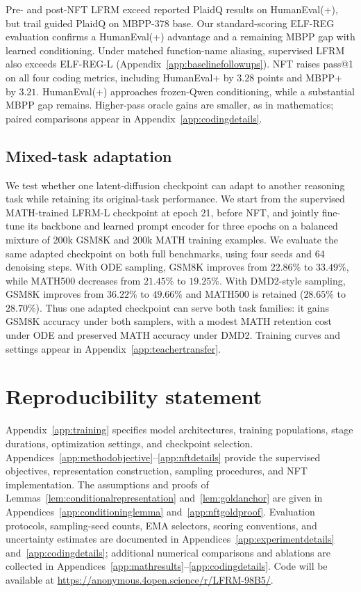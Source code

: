 \documentclass{article}
\newlength{\conferenceparskip}
\newcommand{\rev}[1]{{\color{blue}#1}}
\newcommand{\revp}[1]{\par\color{blue}#1\par\color{black}}
\begin{document}
Pre- and post-NFT LFRM exceed reported PlaidQ results on HumanEval(+), but trail guided PlaidQ on MBPP-378 base. \rev{Our standard-scoring ELF-REG evaluation confirms a HumanEval(+) advantage and a remaining MBPP gap with learned conditioning. Under matched function-name aliasing, supervised LFRM also exceeds ELF-REG-L (Appendix~\ref{app:baselinefollowups}).} NFT raises pass@1 on all four coding metrics, including HumanEval+ by $3.28$ points and MBPP+ by $3.21$. HumanEval(+) approaches frozen-Qwen conditioning, while a substantial MBPP gap remains. Higher-pass oracle gains are smaller, as in mathematics; paired comparisons appear in Appendix~\ref{app:codingdetails}.

\subsection{\rev{Mixed-task adaptation}}
\label{sec:mixedtask}

\revp{We test whether one latent-diffusion checkpoint can adapt to another reasoning task while retaining its original-task performance. We start from the supervised MATH-trained LFRM-L checkpoint at epoch 21, before NFT, and jointly fine-tune its backbone and learned prompt encoder for three epochs on a balanced mixture of 200k GSM8K and 200k MATH training examples. We evaluate the same adapted checkpoint on both full benchmarks, using four seeds and 64 denoising steps. With ODE sampling, GSM8K improves from $22.86\%$ to $33.49\%$, while MATH500 decreases from $21.45\%$ to $19.25\%$. With DMD2-style sampling, GSM8K improves from $36.22\%$ to $49.66\%$ and MATH500 is retained ($28.65\%$ to $28.70\%$). Thus one adapted checkpoint can serve both task families: it gains GSM8K accuracy under both samplers, with a modest MATH retention cost under ODE and preserved MATH accuracy under DMD2. \rev{Training curves and settings appear in Appendix~\ref{app:teachertransfer}.}}



\clearpage
\setlength{\parskip}{\conferenceparskip}
\section*{Reproducibility statement}
Appendix~\ref{app:training} specifies model architectures, training populations, stage durations, optimization settings, and checkpoint selection. Appendices~\ref{app:methodobjective}--\ref{app:nftdetails} provide the supervised objectives, representation construction, sampling procedures, and NFT implementation. The assumptions and proofs of Lemmas~\ref{lem:conditionalrepresentation} and~\ref{lem:goldanchor} are given in Appendices~\ref{app:conditioninglemma} and~\ref{app:nftgoldproof}. Evaluation protocols, sampling-seed counts, EMA selectors, scoring conventions, and uncertainty estimates are documented in Appendices~\ref{app:experimentdetails} and~\ref{app:codingdetails}; additional numerical comparisons and ablations are collected in Appendices~\ref{app:mathresults}--\ref{app:codingdetails}. Code will be available at \url{https://anonymous.4open.science/r/LFRM-98B5/}.
\end{document}
